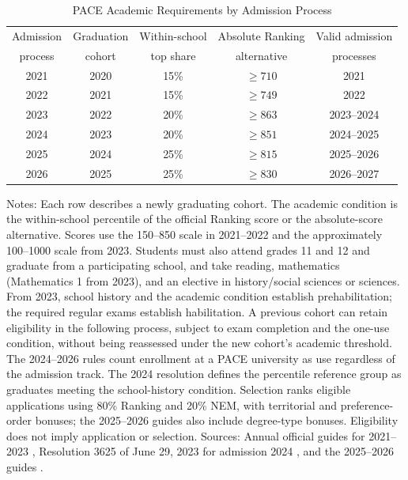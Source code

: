\begin{table}[!htbp]
\singlespacing\renewcommand{\arraystretch}{1.25}\centering
\caption{PACE Academic Requirements by Admission Process}\label{tab: pace annual rules}
\small\begin{tabular}{ccccc}\toprule
Admission & Graduation & Within-school & Absolute Ranking & Valid admission \\
process & cohort & top share & alternative & processes \\\midrule
2021 & 2020 & 15\% & $\geq 710$ & 2021 \\
2022 & 2021 & 15\% & $\geq 749$ & 2022 \\
2023 & 2022 & 20\% & $\geq 863$ & 2023--2024 \\
2024 & 2023 & 20\% & $\geq 851$ & 2024--2025 \\
2025 & 2024 & 25\% & $\geq 815$ & 2025--2026 \\
2026 & 2025 & 25\% & $\geq 830$ & 2026--2027 \\
\bottomrule\end{tabular}\par\smallskip
\begin{minipage}{\textwidth}\footnotesize
Notes: Each row describes a newly graduating cohort. The academic condition is the within-school percentile of the official Ranking score or the absolute-score alternative. Scores use the 150--850 scale in 2021--2022 and the approximately 100--1000 scale from 2023. Students must also attend grades 11 and 12 and graduate from a participating school, and take reading, mathematics (Mathematics 1 from 2023), and an elective in history/social sciences or sciences. From 2023, school history and the academic condition establish prehabilitation; the required regular exams establish habilitation. A previous cohort can retain eligibility in the following process, subject to exam completion and the one-use condition, without being reassessed under the new cohort's academic threshold. The 2024--2026 rules count enrollment at a PACE university as use regardless of the admission track. The 2024 resolution defines the percentile reference group as graduates meeting the school-history condition. Selection ranks eligible applications using 80\% Ranking and 20\% NEM, with territorial and preference-order bonuses; the 2025--2026 guides also include degree-type bonuses. Eligibility does not imply application or selection.
Sources: Annual official guides for 2021--2023 \citep{paceRules2021,paceRules2022,paceRules2023}, Resolution 3625 of June 29, 2023 for admission 2024 \citep{paceRules2024}, and the 2025--2026 guides \citep{paceRules2025,paceRules2026}.
\end{minipage}\end{table}

